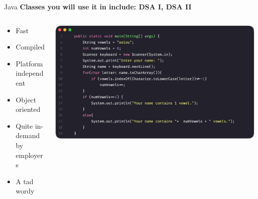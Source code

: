 \documentclass[aspectratio=169,hyperref={unicode}]{beamer}
\begin{document}
\begin{frame}{Java}
\textbf{Classes you will use it in include: DSA I, DSA II}

\begin{columns}
	\begin{column}{0.3\linewidth}
	\begin{itemize}
		\item Fast
		\item Compiled
		\item Platform independent
		\item Object oriented
		\item Quite in-demand by employers
		\item A tad wordy
	\end{itemize}
	\end{column}

	\begin{column}{0.7\linewidth}
	\begin{center}
			\includegraphics[scale=0.117]{java.png}
	\end{center}
	\end{column}
\end{columns}

\end{frame}
\end{document}
